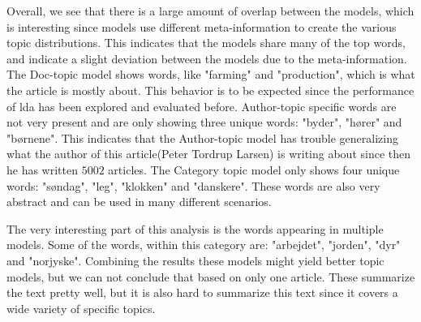 Overall, we see that there is a large amount of overlap between the models, which is interesting since models use different meta-information to create the various topic distributions.
This indicates that the models share many of the top words, and indicate a slight deviation between the models due to the meta-information.
The Doc-topic model shows words, like "farming" and "production", which is what the article is mostly about.
This behavior is to be expected since the performance of \gls{lda} has been explored and evaluated before. 
Author-topic specific words are not very present and are only showing three unique words: "byder", "hører" and "børnene".
This indicates that the Author-topic model has trouble generalizing what the author of this article(Peter Tordrup Larsen) is writing about since then he has written $5002$ articles. 
The Category topic model only shows four unique words: "søndag", "leg", "klokken" and "danskere".
These words are also very abstract and can be used in many different scenarios.

The very interesting part of this analysis is the words appearing in multiple models.
Some of the words, within this category are: "arbejdet", "jorden", "dyr" and "norjyske".
Combining the results these models might yield better topic models, but we can not conclude that based on only one article.
These summarize the text pretty well, but it is also hard to summarize this text since it covers a wide variety of specific topics.
